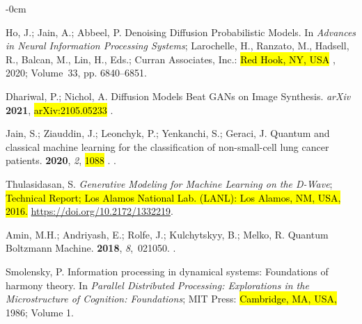 \documentclass[technologies,article,accept,pdftex,moreauthors]{Definitions/mdpi}
\begin{document}
 
\begin{adjustwidth}{-\extralength}{0cm} 
 \begin{thebibliography}{999}

Ho, J.; Jain, A.; Abbeel, P.
\newblock Denoising Diffusion Probabilistic Models.
\newblock In \emph{Advances in Neural Information Processing
  Systems}; Larochelle, H., Ranzato, M., Hadsell, R., Balcan, M., Lin, H., Eds.; Curran Associates, Inc.: \hl{Red Hook, NY, USA}%
, 2020; Volume~33, pp. 6840--6851.

Dhariwal, P.; Nichol, A.
\newblock Diffusion Models Beat GANs on Image Synthesis. \emph{arXiv} \textbf{2021}, \hl{arXiv:2105.05233}%
.

Jain, S.; Ziauddin, J.; Leonchyk, P.; Yenkanchi, S.; Geraci, J.
\newblock Quantum and classical machine learning for the classification of
  non-small-cell lung cancer patients.
 {\bf 2020}, {\em 2}, \hl{1088}%
.
.

Thulasidasan, S.
\newblock \emph{Generative Modeling for Machine Learning on the D-Wave}; \hl{Technical Report;  Los Alamos National Lab. (LANL): Los Alamos, NM, USA, 2016.} {\url{https://doi.org/10.2172/1332219}}.

Amin, M.H.; Andriyash, E.; Rolfe, J.; Kulchytskyy, B.; Melko, R.
\newblock Quantum Boltzmann Machine.
 {\bf 2018}, {\em 8},~021050.
.


Smolensky, P. Information processing in dynamical systems: Foundations of harmony theory. In {\em Parallel Distributed Processing: Explorations in the Microstructure of Cognition: Foundations}; MIT Press:  \hl{Cambridge, MA, USA,} %
 1986; Volume 1.


\end{thebibliography}
\end{adjustwidth}
\end{document}
